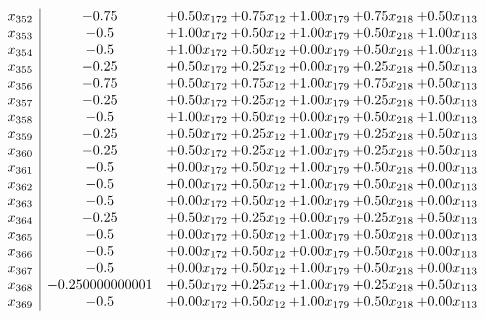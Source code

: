 \documentclass[8pt]{article}
\begin{document}
\[\begin{array}{c| c c@{\hskip 2pt} c@{\hskip 2pt} c@{\hskip 2pt} c@{\hskip 2pt} c@{\hskip 2pt} }
 x_{352}   &  -0.75 & +  0.50 x_{172} & +  0.75 x_{12} & +  1.00 x_{179} & +  0.75 x_{218} & +  0.50 x_{113}\\
 x_{353}   &  -0.5 & +  1.00 x_{172} & +  0.50 x_{12} & +  1.00 x_{179} & +  0.50 x_{218} & +  1.00 x_{113}\\
 x_{354}   &  -0.5 & +  1.00 x_{172} & +  0.50 x_{12} & +  0.00 x_{179} & +  0.50 x_{218} & +  1.00 x_{113}\\
 x_{355}   &  -0.25 & +  0.50 x_{172} & +  0.25 x_{12} & +  0.00 x_{179} & +  0.25 x_{218} & +  0.50 x_{113}\\
 x_{356}   &  -0.75 & +  0.50 x_{172} & +  0.75 x_{12} & +  1.00 x_{179} & +  0.75 x_{218} & +  0.50 x_{113}\\
 x_{357}   &  -0.25 & +  0.50 x_{172} & +  0.25 x_{12} & +  1.00 x_{179} & +  0.25 x_{218} & +  0.50 x_{113}\\
 x_{358}   &  -0.5 & +  1.00 x_{172} & +  0.50 x_{12} & +  0.00 x_{179} & +  0.50 x_{218} & +  1.00 x_{113}\\
 x_{359}   &  -0.25 & +  0.50 x_{172} & +  0.25 x_{12} & +  1.00 x_{179} & +  0.25 x_{218} & +  0.50 x_{113}\\
 x_{360}   &  -0.25 & +  0.50 x_{172} & +  0.25 x_{12} & +  1.00 x_{179} & +  0.25 x_{218} & +  0.50 x_{113}\\
 x_{361}   &  -0.5 & +  0.00 x_{172} & +  0.50 x_{12} & +  1.00 x_{179} & +  0.50 x_{218} & +  0.00 x_{113}\\
 x_{362}   &  -0.5 & +  0.00 x_{172} & +  0.50 x_{12} & +  1.00 x_{179} & +  0.50 x_{218} & +  0.00 x_{113}\\
 x_{363}   &  -0.5 & +  0.00 x_{172} & +  0.50 x_{12} & +  1.00 x_{179} & +  0.50 x_{218} & +  0.00 x_{113}\\
 x_{364}   &  -0.25 & +  0.50 x_{172} & +  0.25 x_{12} & +  0.00 x_{179} & +  0.25 x_{218} & +  0.50 x_{113}\\
 x_{365}   &  -0.5 & +  0.00 x_{172} & +  0.50 x_{12} & +  1.00 x_{179} & +  0.50 x_{218} & +  0.00 x_{113}\\
 x_{366}   &  -0.5 & +  0.00 x_{172} & +  0.50 x_{12} & +  0.00 x_{179} & +  0.50 x_{218} & +  0.00 x_{113}\\
 x_{367}   &  -0.5 & +  0.00 x_{172} & +  0.50 x_{12} & +  1.00 x_{179} & +  0.50 x_{218} & +  0.00 x_{113}\\
 x_{368}   &  -0.250000000001 & +  0.50 x_{172} & +  0.25 x_{12} & +  1.00 x_{179} & +  0.25 x_{218} & +  0.50 x_{113}\\
 x_{369}   &  -0.5 & +  0.00 x_{172} & +  0.50 x_{12} & +  1.00 x_{179} & +  0.50 x_{218} & +  0.00 x_{113}\\

\end{array}\]
\end{document}
